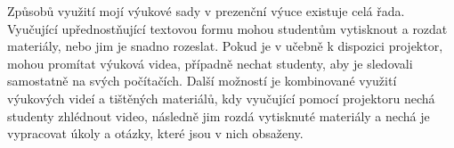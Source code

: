 Způsobů využití mojí výukové sady v prezenční výuce existuje celá řada.
Vyučující upřednostňující textovou formu mohou studentům vytisknout a rozdat materiály, nebo jim je snadno rozeslat.
Pokud je v učebně k dispozici projektor, mohou promítat výuková videa, případně nechat studenty, aby je sledovali samostatně na svých počítačích.
Další možností je kombinované využití výukových videí a tištěných materiálů, kdy vyučující pomocí projektoru nechá studenty zhlédnout video, následně jim rozdá vytisknuté materiály a nechá je vypracovat úkoly a otázky, které jsou v nich obsaženy.